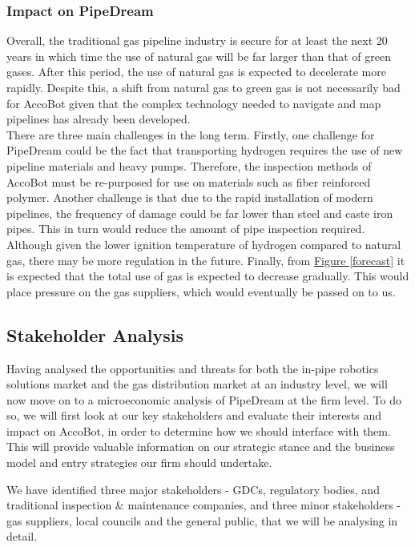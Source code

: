 \documentclass[11pt]{article}		%
\newcommand{\figref}[1]{\hyperref[#1]{Figure \ref*{#1}}}    %
\begin{document}
    		\subsubsection[Impact on PipeDream]{Impact on PipeDream}
    		Overall, the traditional gas pipeline industry is secure for at least the next 20 years in which time the use of natural gas will be far larger than that of green gases. After this period, the use of natural gas is expected to decelerate more rapidly. Despite this, a shift from natural gas to green gas is not necessarily bad for AccoBot given that the complex technology needed to navigate and map pipelines has already been developed. \\
    	    \hspace*{3ex}There are three main challenges in the long term. Firstly, one challenge for PipeDream could be the fact that transporting hydrogen requires the use of new pipeline materials and heavy pumps. Therefore, the inspection methods of AccoBot must be re-purposed for use on materials such as fiber reinforced polymer. Another challenge is that due to the rapid installation of modern pipelines, the frequency of damage could be far lower than steel and caste iron pipes. This in turn would reduce the amount of pipe inspection required. Although given the lower ignition temperature of hydrogen compared to natural gas, there may be more regulation in the future. Finally, from \figref{forecast} it is expected that the total use of gas is expected to decrease gradually. This would place pressure on the gas suppliers, which would eventually be passed on to us. 

	\subsection{Stakeholder Analysis}

		Having analysed the opportunities and threats for both the in-pipe robotics solutions market and the gas distribution market at an industry level, we will now move on to a microeconomic analysis of PipeDream at the firm level. To do so, we will first look at our key stakeholders and evaluate their interests and impact on AccoBot, in order to determine how we should interface with them. This will provide valuable information on our strategic stance and the business model and entry strategies our firm should undertake.
		
		We have identified three major stakeholders - GDCs, regulatory bodies, and traditional inspection \& maintenance companies, and three minor stakeholders - gas suppliers, local councils and the general public, that we will be analysing in detail. 
		
\end{document}
